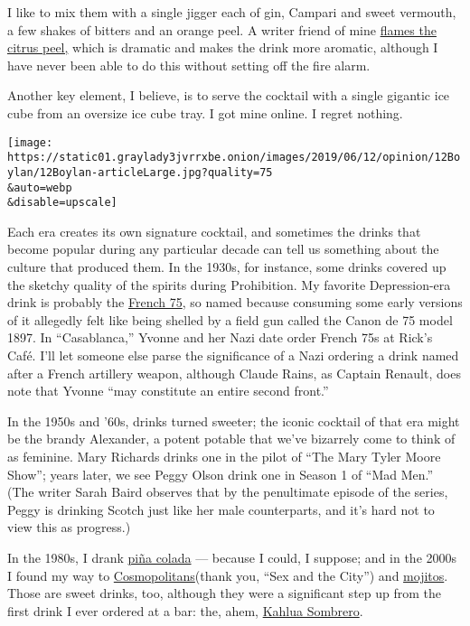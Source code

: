 I like to mix them with a single jigger each of gin, Campari and sweet
vermouth, a few shakes of bitters and an orange peel. A writer friend of
mine \href{https://www.youtube.com/watch?v=w-vJpeIwVwk}{flames the
citrus peel,} which is dramatic and makes the drink more aromatic,
although I have never been able to do this without setting off the fire
alarm.

Another key element, I believe, is to serve the cocktail with a single
gigantic ice cube from an oversize ice cube tray. I got mine online. I
regret nothing.

\texttt{[image: https://static01.graylady3jvrrxbe.onion/images/2019/06/12/opinion/12Boylan/12Boylan-articleLarge.jpg?quality=75\\\&auto=webp\\\&disable=upscale]}

Each era creates its own signature cocktail, and sometimes the drinks
that become popular during any particular decade can tell us something
about the culture that produced them. In the 1930s, for instance, some
drinks covered up the sketchy quality of the spirits during Prohibition.
My favorite Depression-era drink is probably the
\href{https://food52.com/recipes/13206-voila-l-ete-the-french-75}{French
75}, so named because consuming some early versions of it allegedly felt
like being shelled by a field gun called the Canon de 75 model 1897. In
``Casablanca,'' Yvonne and her Nazi date order French 75s at Rick's
Café. I'll let someone else parse the significance of a Nazi ordering a
drink named after a French artillery weapon, although Claude Rains, as
Captain Renault, does note that Yvonne ``may constitute an entire second
front.''

In the 1950s and '60s, drinks turned sweeter; the iconic cocktail of
that era might be the brandy Alexander, a potent potable that we've
bizarrely come to think of as feminine. Mary Richards drinks one in the
pilot of ``The Mary Tyler Moore Show''; years later, we see Peggy Olson
drink one in Season 1 of ``Mad Men.'' (The writer Sarah Baird observes
that by the penultimate episode of the series, Peggy is drinking Scotch
just like her male counterparts, and it's hard not to view this as
progress.)

In the 1980s, I drank
\href{https://www.bonappetit.com/recipe/bas-best-pina-colada}{piña
colada} --- because I could, I suppose; and in the 2000s I found my way
to \href{http://www.drinksmixer.com/drink234.html}{Cosmopolitans}(thank
you, ``Sex and the City'') and
\href{https://www.foodnetwork.com/recipes/mojito-recipe0-1939252}{mojitos}.
Those are sweet drinks, too, although they were a significant step up
from the first drink I ever ordered at a bar: the, ahem,
\href{https://www.thespruceeats.com/sombrero-drink-recipe-759459}{Kahlua
Sombrero}.

